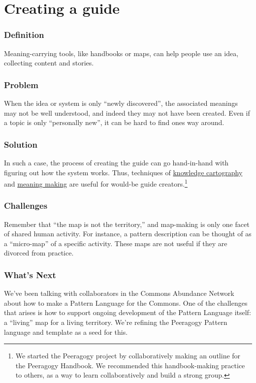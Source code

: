 \section{Creating a guide}\label{sec:Creating_a_guide}
\subsubsection*{Definition} Meaning-carrying tools, like handbooks or maps, can
help people use an idea, collecting content and stories.

\subsubsection*{Problem} When the idea or system is only ``newly discovered'',
the associated meanings may not be well understood, and indeed they may
not have been created. Even if a topic is only ``personally new'', it
can be hard to find ones way around.

\subsubsection*{Solution} In such a case, the process of creating the guide can
go hand-in-hand with figuring out how the system works. Thus, techniques
of \href{http://knowledgecartography.org/}{knowledge cartography}
and \href{http://www.hitl.washington.edu/publications/r-97-47/two.html}{meaning
making} are useful for would-be guide creators.\footnote{We started the Peeragogy project by collaboratively
making an outline for the Peeragogy Handbook. We recommended this
handbook-making practice to others, as a way to learn collaboratively
and build a strong group.}

\subsubsection*{Challenges} Remember that ``the map is not the territory,'' and
map-making is only one facet of shared human activity. For instance, a
pattern description can be thought of as a ``micro-map'' of a specific
activity. These maps are not useful if they are divorced from practice.

\subsubsection*{What's Next} We've been talking with collaborators in the
Commons Abundance Network about how to make a Pattern Language for the
Commons. One of the challenges that arises is how to support ongoing
development of the Pattern Language itself: a ``living'' map for a
living territory. We're refining the Peeragogy Pattern language and
template as a seed for this.


